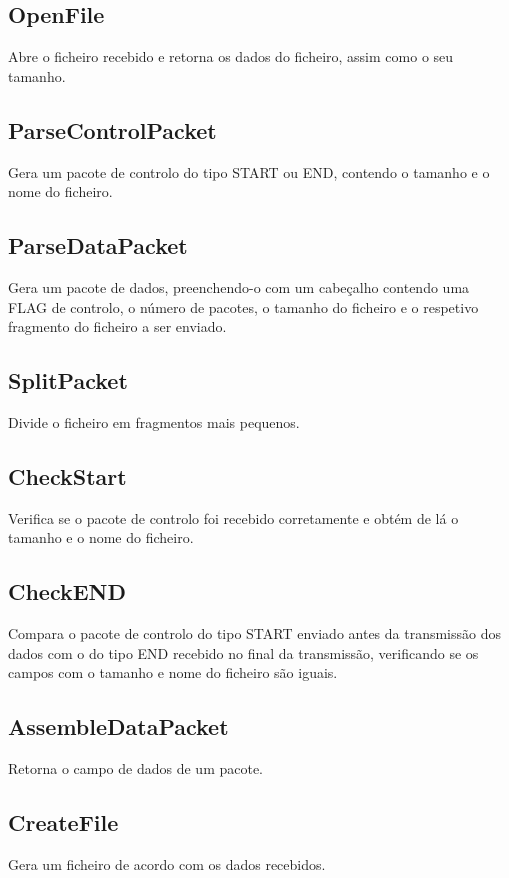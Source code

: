 \documentclass{article}
\begin{document}
\subsection{OpenFile}
Abre o ficheiro recebido e retorna os dados do ficheiro, assim como o seu tamanho.

\subsection{ParseControlPacket}
Gera um pacote de controlo do tipo START ou END, contendo o tamanho e o nome do ficheiro.

\subsection{ParseDataPacket}
Gera um pacote de dados, preenchendo-o com um cabeçalho contendo uma FLAG de controlo, o número de pacotes, o tamanho do ficheiro e o respetivo fragmento do ficheiro a ser enviado.

\subsection{SplitPacket}
Divide o ficheiro em fragmentos mais pequenos.

\subsection{CheckStart}
Verifica se o pacote de controlo foi recebido corretamente e obtém de lá o tamanho e o nome do ficheiro.

\subsection{CheckEND}
Compara o pacote de controlo do tipo START enviado antes da transmissão dos dados com o do tipo END recebido no final da transmissão, verificando se os campos com o tamanho e nome do ficheiro são iguais.

\subsection{AssembleDataPacket}
Retorna o campo de dados de um pacote.

\subsection{CreateFile}
Gera um ficheiro de acordo com os dados recebidos.
\end{document}
